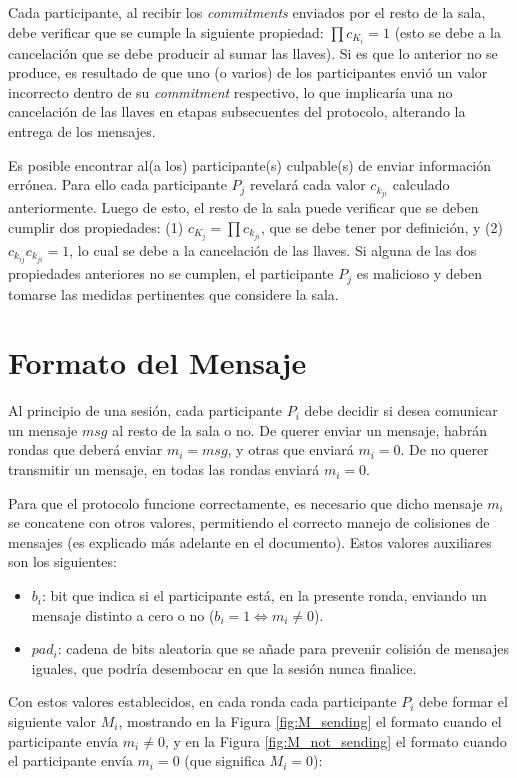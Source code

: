 Cada participante, al recibir los \emph{commitments} enviados por el resto de la 
sala, debe verificar que se cumple la siguiente propiedad: $\prod c_{K_i} = 1$ 
(esto se debe a la cancelación que se debe producir al sumar las llaves). Si es que 
lo anterior no se produce, es resultado de que uno (o varios) de los participantes envió un 
valor incorrecto dentro de su \emph{commitment} respectivo, lo que implicaría una 
no cancelación de las llaves en etapas subsecuentes del protocolo, alterando la entrega 
de los mensajes.

Es posible encontrar al(a los) participante(s) culpable(s) de enviar información errónea. 
Para ello cada participante $P_j$ revelará cada valor $c_{k_{ji}}$ calculado anteriormente. 
Luego de esto, el resto de la sala puede verificar que se deben cumplir dos propiedades: 
(1) $c_{K_j} = \prod c_{k_{ji}}$, que se debe tener por definición, y 
(2) $c_{k_{ij}} c_{k_{ji}} = 1$, lo cual se debe a la cancelación de las llaves. Si alguna 
de las dos propiedades anteriores no se cumplen, el participante $P_j$ es malicioso y deben 
tomarse las medidas pertinentes que considere la sala.

\section{Formato del Mensaje}

Al principio de una sesión, cada participante $P_i$ debe decidir si desea comunicar 
un mensaje $msg$ al resto de la sala o no. De querer enviar un mensaje, habrán 
rondas que deberá enviar $m_i = msg$, y otras que enviará $m_i = 0$. De no querer 
transmitir un mensaje, en todas las rondas enviará $m_i = 0$. 

Para que el protocolo funcione correctamente, es necesario que dicho mensaje $m_i$ 
se concatene con otros valores, permitiendo el correcto manejo de colisiones de 
mensajes (es explicado más adelante en el documento). Estos valores auxiliares son 
los siguientes:
\begin{itemize}
    \item $b_i$: bit que indica si el participante está, en la presente ronda, 
    enviando un mensaje distinto a cero o no ($b_i = 1 \iff m_i \neq 0$).
    \item $pad_i$: cadena de bits aleatoria que se añade para prevenir colisión 
    de mensajes iguales, que podría desembocar en que la sesión nunca finalice.
\end{itemize}

Con estos valores establecidos, en cada ronda cada participante $P_i$ debe formar 
el siguiente valor $M_i$, mostrando en la Figura \ref{fig:M_sending} el formato cuando 
el participante envía $m_i \neq 0$, y en la Figura \ref{fig:M_not_sending} el formato 
cuando el participante envía $m_i = 0$ (que significa $M_i = 0$):

